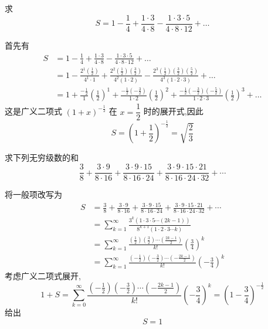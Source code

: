 \begin{questions}
    \question 求
    \[
    S = 1 - \frac{1}{4} + \frac{1 \cdot 3}{4 \cdot 8} - \frac{1 \cdot 3 \cdot 5}{4 \cdot 8 \cdot 12} + \dots
    \]
    \begin{solution}
        首先有
        \begin{align*}
        S &= 1 - \frac{1}{4} + \frac{1 \cdot 3}{4 \cdot 8} - \frac{1 \cdot 3 \cdot 5}{4 \cdot 8 \cdot 12} + \dots \\
        &= 1 - \frac{2^1\left(\frac{1}{2}\right)}{4^1 \cdot 1} + \frac{2^2\left(\frac{1}{2}\right)\left(\frac{3}{2}\right)}{4^2(1 \cdot 2)} - \frac{2^3\left(\frac{1}{2}\right)\left(\frac{3}{2}\right)\left(\frac{5}{2}\right)}{4^3(1 \cdot 2 \cdot 3)} + \dots \\
        &= 1 + \frac{-\frac{1}{2}}{1}\left(\frac{1}{2}\right)^1 + \frac{-\frac{1}{2}\left(-\frac{3}{2}\right)}{1 \cdot 2}\left(\frac{1}{2}\right)^2 + \frac{-\frac{1}{2}\left(-\frac{3}{2}\right)\left(-\frac{5}{2}\right)}{1 \cdot 2 \cdot 3}\left(\frac{1}{2}\right)^3 + \dots 
        \end{align*}
        这是广义二项式 $(1+x)^{-\frac{1}{2}}$ 在 $x = \dfrac{1}{2}$ 时的展开式,因此
        \[
        S = \left(1 + \frac{1}{2}\right)^{-\frac{1}{2}} = \sqrt{\frac{2}{3}}
        \]
    \end{solution}

    \question 求下列无穷级数的和
    \[
    \frac{3}{8}+\frac{3\cdot9}{8\cdot16}+\frac{3\cdot9\cdot15}{8\cdot16\cdot24}
    +\frac{3\cdot9\cdot15\cdot21}{8\cdot16\cdot24\cdot32}+\cdots
    \]
    \begin{solution}
        将一般项改写为
        \begin{align*}
        S&=\frac{3}{8}+\frac{3\cdot9}{8\cdot16}+\frac{3\cdot9\cdot15}{8\cdot16\cdot24}
        +\frac{3\cdot9\cdot15\cdot21}{8\cdot16\cdot24\cdot32}+\cdots \\
        &=\sum_{k=1}^{\infty}
        \frac{3^k(1\cdot3\cdot5\cdots(2k-1))}{8^{k+1}(1\cdot2\cdot3\cdots k)} \\
        &= \sum_{k=1}^{\infty}
        \frac{\left(\frac12\right)\left(\frac32\right)\cdots\left(\frac{2k-1}{2}\right)}{k!}\left(\frac34\right)^k \\
        &=\sum_{k=1}^{\infty}
        \frac{\left(-\frac12\right)\left(-\frac32\right)\cdots\left(-\frac{2k-1}{2}\right)}{k!}\left(-\frac34\right)^k
        \end{align*}
        考虑广义二项式展开,
        \[
        1+S=\sum_{k=0}^{\infty}
        \frac{\left(-\frac12\right)\left(-\frac32\right)\cdots\left(-\frac{2k-1}{2}\right)}{k!}\left(-\frac34\right)^k=\left(1-\frac34\right)^{-\frac12}
        \]
        给出
        \[
        S=1
        \]
    \end{solution}


\end{questions}
